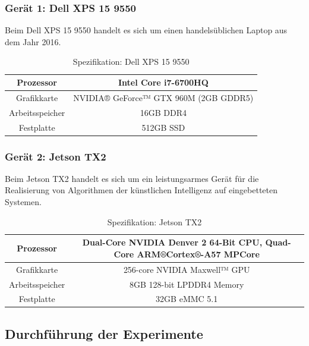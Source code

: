 \pagebreak

\subsubsection{Gerät 1: Dell XPS 15 9550}

Beim Dell XPS 15 9550 handelt es sich um einen handelsüblichen Laptop aus dem Jahr 2016.

\begin{table}[H]
    \centering
    \begin{tabular}{ |c|c| }
        \hline
        Prozessor       & Intel Core i7-6700HQ \\ \hline
        Grafikkarte     & NVIDIA® GeForce™ GTX 960M (2GB GDDR5) \\ \hline
        Arbeitsspeicher & 16GB DDR4  \\ \hline
        Festplatte      & 512GB SSD \\ \hline
    \end{tabular}
    \caption{Spezifikation: Dell XPS 15 9550}
    \label{tab:xps15}
\end{table}

\subsubsection{Gerät 2: Jetson TX2}

Beim Jetson TX2 handelt es sich um ein leistungsarmes Gerät für die Realisierung von Algorithmen der künstlichen Intelligenz auf eingebetteten Systemen.

\begin{table}[H]
    \centering
    \begin{tabular}{ |c|c| }
        \hline
        Prozessor       & Dual-Core NVIDIA Denver 2 64-Bit CPU, Quad-Core ARM®Cortex®-A57 MPCore \\ \hline
        Grafikkarte     & 256-core NVIDIA Maxwell™ GPU \\ \hline
        Arbeitsspeicher & 8GB 128-bit LPDDR4 Memory  \\ \hline
        Festplatte      & 32GB eMMC 5.1 \\ \hline
    \end{tabular}
    \caption{Spezifikation: Jetson TX2}
    \label{tab:jetson_tx1}
\end{table}

\subsection{Durchführung der Experimente}

